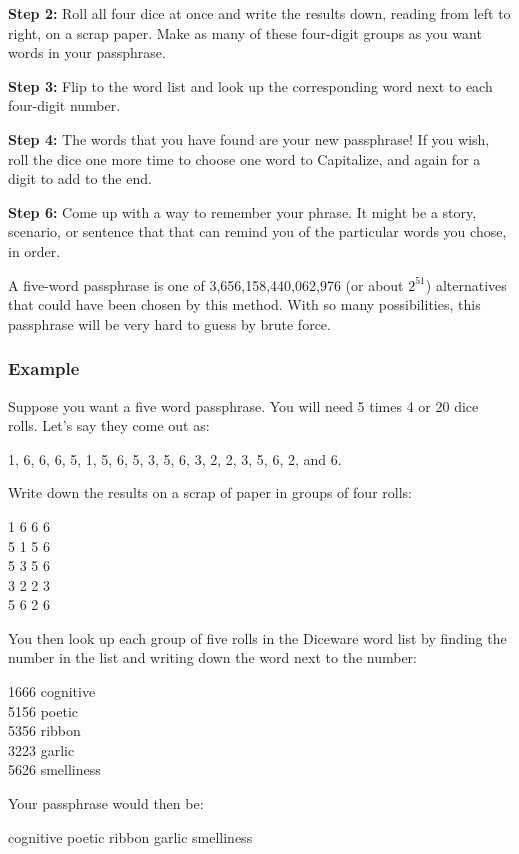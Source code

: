 \textbf{Step 2:} Roll all four dice at once and write the results down, reading from left to right, on a scrap paper. Make as many of these four-digit groups as you want words in your passphrase.

\textbf{Step 3:} Flip to the word list and look up the corresponding word next to each four-digit number.

\textbf{Step 4:} The words that you have found are your new passphrase! If you wish, roll the dice one more time to choose one word to Capitalize, and again for a digit to add to the end.

\textbf{Step 6:} Come up with a way to remember your phrase. It might be a story, scenario, or sentence that that can remind you of the particular words you chose, in order.

A five-word passphrase is one of 3,656,158,440,062,976 (or about $2^{51}$) alternatives that could have been chosen by this method. With so many possibilities, this passphrase will be very hard to guess by brute force.

\subsubsection*{Example}

Suppose you want a five word passphrase. You will need 5 times 4 or 20 dice rolls. Let's say they come out as:

1, 6, 6, 6, 5, 1, 5, 6, 5, 3, 5, 6, 3, 2, 2, 3, 5, 6, 2, and 6. 

Write down the results on a scrap of paper in groups of four rolls:

1 6 6 6 \\
5 1 5 6 \\
5 3 5 6 \\
3 2 2 3 \\
5 6 2 6

You then look up each group of five rolls in the Diceware word list by finding the number in the list and writing down the word next to the number:

1666 cognitive \\
5156 poetic \\
5356 ribbon \\
3223 garlic \\
5626 smelliness

Your passphrase would then be:

cognitive poetic ribbon garlic smelliness

\newpage
{}
\fontsize{5}{2mm}\selectfont
\begin{multicols}{5}
\noindent
\end{multicols}
\restoregeometry
